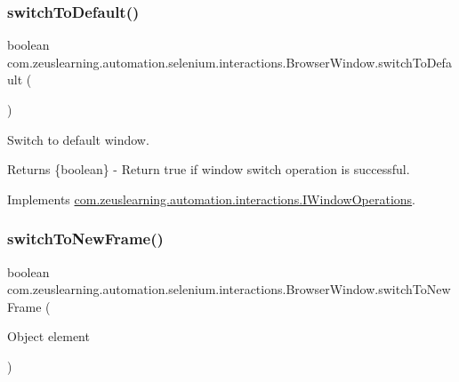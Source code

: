 \subsubsection{\texorpdfstring{switch\+To\+Default()}{switchToDefault()}}
{\footnotesize\ttfamily boolean com.\+zeuslearning.\+automation.\+selenium.\+interactions.\+Browser\+Window.\+switch\+To\+Default (\begin{DoxyParamCaption}{ }\end{DoxyParamCaption})\hspace{0.3cm}{\ttfamily [inline]}}

Switch to default window.

\begin{DoxyReturn}{Returns}
\{boolean\} -\/ Return {\ttfamily true} if window switch operation is successful. 
\end{DoxyReturn}


Implements \hyperlink{interfacecom_1_1zeuslearning_1_1automation_1_1interactions_1_1IWindowOperations_a6f6837d3d153ce5f6504689d2ec88613}{com.\+zeuslearning.\+automation.\+interactions.\+I\+Window\+Operations}.

\hypertarget{classcom_1_1zeuslearning_1_1automation_1_1selenium_1_1interactions_1_1BrowserWindow_ae6c8f6ecf277ac9da4d262eff3147403}{}\label{classcom_1_1zeuslearning_1_1automation_1_1selenium_1_1interactions_1_1BrowserWindow_ae6c8f6ecf277ac9da4d262eff3147403} 
\subsubsection{\texorpdfstring{switch\+To\+New\+Frame()}{switchToNewFrame()}\hspace{0.1cm}{\footnotesize\ttfamily [1/2]}}
{\footnotesize\ttfamily boolean com.\+zeuslearning.\+automation.\+selenium.\+interactions.\+Browser\+Window.\+switch\+To\+New\+Frame (\begin{DoxyParamCaption}\item[{Object}]{element }\end{DoxyParamCaption})\hspace{0.3cm}{\ttfamily [inline]}}

